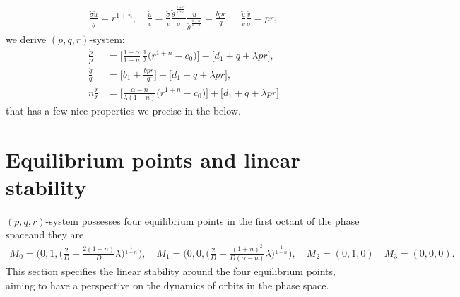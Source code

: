 \documentclass[a4paper,11pt]{article}
\def\tv{{\tilde{v}}}
\def\tth{{\tilde{\theta}}}
\def\ts{{\tilde{\sigma}}}
\def\tu{{\tilde{u}}}
\def\dpp{\dot{p}}
\def\dqq{\dot{q}}
\def\drr{\dot{r}}
\begin{document}
\begin{align*}
 \frac{\ts\tu}{\tth} = r^{1+n}, \quad \frac{\tu}{\tv} = \frac{\ts}{\tv} \frac{\tth^{\,\frac{1+\alpha}{1+n}}}{\ts} \frac{u}{\tth^{\,\frac{1+\alpha}{1+n}}} = \frac{bpr}{q}, \quad \frac{\tu}{\tv} \frac{\tv}{\ts} = pr,
\end{align*}
we derive $(p,q,r)$-system:
\begin{equation} \label{eq:pqrsys}
\begin{aligned}
 \frac{\dpp}{p}&=\Big[\frac{1+\alpha}{1+n}\,\frac{1}{\lambda }\Big(r^{1+n}-c_0\Big)\Big] -\Big[d_1 + q + \lambda pr\Big],\\
 \frac{\dqq}{q}&=\Big[b_1 +\frac{bpr}{q}\Big] -\Big[d_1 + q + \lambda pr\Big],\\
 n\frac{\drr}{r}&=\Big[\frac{\alpha-n}{\lambda(1+n)}\Big(r^{1+n}-c_0\Big)\Big]+\Big[d_1 + q + \lambda pr\Big]
\end{aligned}
\end{equation}
that has a few nice properties we precise in the below.
\section{Equilibrium points and linear stability}
$(p,q,r)$-system possesses four equilibrium points in the first octant of the phase space\footnotemark[1] and they are
\begin{align*}
 M_0=\Big(0,1,\big(\frac{2}{D} + \frac{2(1+n)}{D} \lambda\big)^{\frac{1}{1+n}}\Big), \quad M_1=\Big(0,0,\big(\frac{2}{D} -\frac{(1+n)^2}{D(\alpha-n)} \lambda\big)^{\frac{1}{1+n}}\Big), \quad  M_2=(0,1,0) \quad M_3 = (0,0,0).
\end{align*}
This section specifies the linear stability around the four equilibrium points, aiming to have a perspective on the dynamics of orbits in the phase space.
\end{document}
